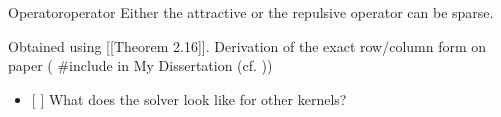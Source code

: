 \begin{definition}{Operator}{operator}
  Either the attractive or the repulsive operator can be sparse.

  Obtained using {[}{[}Theorem 2.16{]}{]}. Derivation of the exact
  row/column form on paper ( \#include in My Dissertation (cf. ))

  \begin{itemize}
    \tightlist
    \item
          {[} {]} What does the solver look like for other kernels?
  \end{itemize}
\end{definition}
